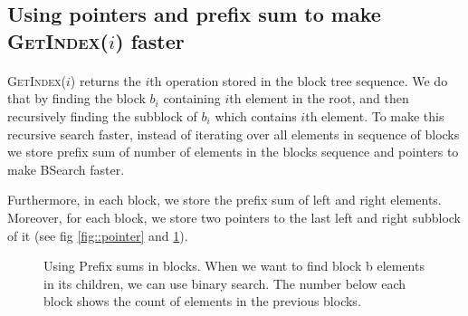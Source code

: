 \documentclass[10pt]{article}
\theoremstyle{definition}
\newtheorem{definition}{Definition}
\begin{document}
\subsection{Using pointers and prefix sum to make \textsc{GetIndex}($i$) faster}
\paragraph{}
\textsc{GetIndex}($i$) returns the $i$th operation stored in the block tree sequence. We do that by finding the block $b_i$ containing $i$th element in the root, and then recursively finding the subblock of $b_i$ which contains $i$th element. To make this recursive search faster, instead of iterating over all elements in sequence of blocks we store prefix sum of number of elements in the blocks sequence and pointers to make BSearch faster.

Furthermore, in each block, we store the prefix sum of left and right elements. Moreover, for each block, we store two pointers to the last left and right subblock of it (see fig \ref{fig::pointer} and \ref{fig:prefix}).

\begin{figure}
\begin{center}
\end{center}
\caption{\label{fig:prefix} Using Prefix sums in blocks. When we want to find block b elements in its children, we can use binary search. The number below each block shows the count of elements in the previous blocks.}
\end{figure}
\end{document}

